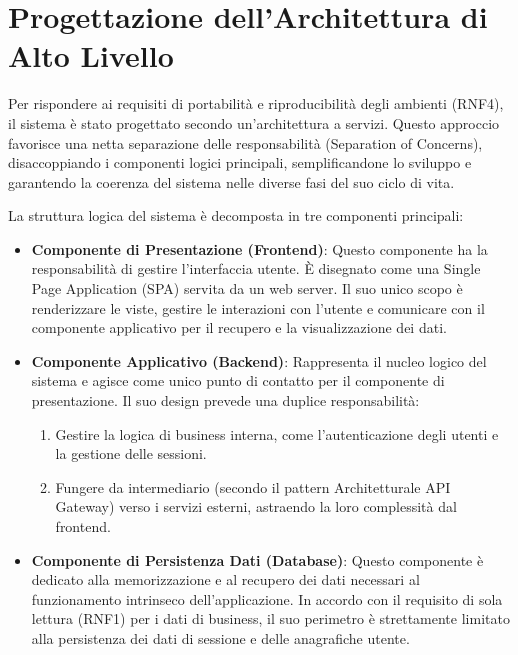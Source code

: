 \documentclass[12pt,a4paper,openright,twoside]{book}
\begin{document}
\section{Progettazione dell'Architettura di Alto Livello}
\label{sec:design_architettura}

Per rispondere ai requisiti di portabilità e riproducibilità degli ambienti (RNF4), il sistema è stato progettato secondo un'architettura a servizi. Questo approccio favorisce una netta separazione delle responsabilità (Separation of Concerns), disaccoppiando i componenti logici principali, semplificandone lo sviluppo e garantendo la coerenza del sistema nelle diverse fasi del suo ciclo di vita.

La struttura logica del sistema è decomposta in tre componenti principali:

\begin{itemize}
    \item \textbf{Componente di Presentazione (Frontend)}: Questo componente ha la responsabilità di gestire l'interfaccia utente. È disegnato come una Single Page Application (SPA) servita da un web server. Il suo unico scopo è renderizzare le viste, gestire le interazioni con l'utente e comunicare con il componente applicativo per il recupero e la visualizzazione dei dati.

    \item \textbf{Componente Applicativo (Backend)}: Rappresenta il nucleo logico del sistema e agisce come unico punto di contatto per il componente di presentazione. Il suo design prevede una duplice responsabilità:
          \begin{enumerate}
              \item Gestire la logica di business interna, come l'autenticazione degli utenti e la gestione delle sessioni.
              \item Fungere da intermediario (secondo il pattern Architetturale API Gateway) verso i servizi esterni, astraendo la loro complessità dal frontend.
          \end{enumerate}

    \item \textbf{Componente di Persistenza Dati (Database)}: Questo componente è dedicato alla memorizzazione e al recupero dei dati necessari al funzionamento intrinseco dell'applicazione. In accordo con il requisito di sola lettura (RNF1) per i dati di business, il suo perimetro è strettamente limitato alla persistenza dei dati di sessione e delle anagrafiche utente.
\end{itemize}
\end{document}
